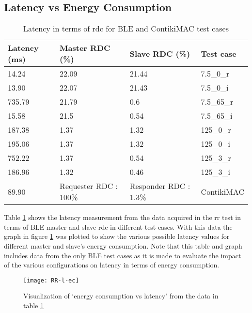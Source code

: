 \subsection{Latency vs Energy Consumption}

\begin{table}[b]
\centering
\setlength{\extrarowheight}{1.5pt}
\begin{tabular}[c]{|l|l|l|l|}
\hline
Latency (ms) & Master RDC (\%) & Slave RDC (\%) & Test case \\ \hline
14.24 & 22.09 & 21.44 & 7.5\_0\_r \\ \hline
13.90 & 22.07 & 21.43 & 7.5\_0\_i \\ \hline
735.79 & 21.79 & 0.6 & 7.5\_65\_r \\ \hline
15.58 & 21.5 & 0.54 & 7.5\_65\_i \\ \hline
187.38 & 1.37 & 1.32 & 125\_0\_r \\ \hline
195.06 & 1.37 & 1.32 & 125\_0\_i \\ \hline
752.22 & 1.37 & 0.54 & 125\_3\_r \\ \hline
186.96 & 1.32 & 0.46 & 125\_3\_i \\ \hline  \hline
89.90 & Requester RDC : 100\% & Responder RDC : 1.3\% & ContikiMAC \\ \hline
\end{tabular}
\caption{Latency in terms of \gls{rdc} for BLE and ContikiMAC test cases}
\label{tbl:latVsEnergy}
\end{table}

Table \ref{tbl:latVsEnergy} shows the latency measurement from the data acquired in the \gls{rr} test in terms of BLE master and slave \gls{rdc} in different test cases. With this data the graph in figure \ref{fig:RR-l-ec} was plotted to show the various possible latency values for different master and slave's energy consumption. Note that this table and graph includes data from the only BLE test cases as it is made to evaluate the impact of the various configurations on latency in terms of energy consumption.

\begin{figure}[tb]
\texttt{[image: RR-l-ec]}
\caption{Visualization of `energy consumption vs
latency' from the data in table \ref{tbl:latVsEnergy}}
\label{fig:RR-l-ec}
\end{figure}

